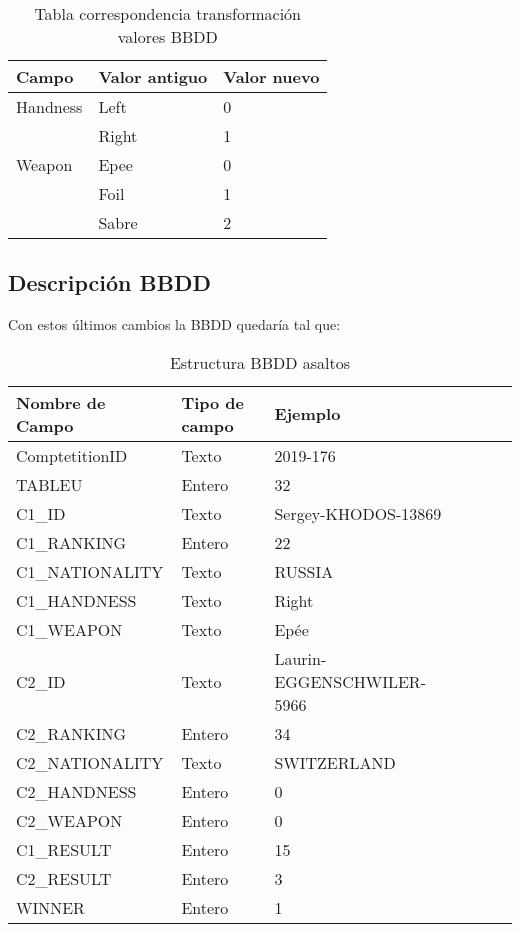 \begin{table}[htb]%
  \centering
  \caption{Tabla correspondencia transformación valores BBDD}
  \label{tab:anchura}
  \begin{tabular}{ | l | ll | }
    \hline
    Campo & \multicolumn{1}{l|}{Valor antiguo} & Valor nuevo \\ \hline
    Handness & Left & 0 \\ \cline{2-3}
     & Right & 1 \\ \hline
    Weapon & Epee & 0 \\ \cline{2-3}
     & Foil & 1 \\ \cline{2-3}
     & Sabre & 2 \\ \hline
  \end{tabular}
\end{table}

\subsection{Descripción BBDD}

Con estos últimos cambios la BBDD quedaría tal que:
\begin{table}[htb]%
  \centering
  \caption{Estructura BBDD asaltos}
  \label{tab:anchura}
  \begin{tabular}{ | l | l | l | l | l | l | }
    \hline
    Nombre de Campo & Tipo de campo & Ejemplo \\ \hline
    ComptetitionID & Texto & 2019-176 \\ \hline
    TABLEU & Entero & 32 \\ \hline
    C1\_ID & Texto & Sergey-KHODOS-13869 \\ \hline
    C1\_RANKING & Entero & 22 \\ \hline
    C1\_NATIONALITY & Texto & RUSSIA \\ \hline
    C1\_HANDNESS & Texto & Right \\ \hline
    C1\_WEAPON & Texto & Epée \\ \hline
    C2\_ID & Texto & Laurin-EGGENSCHWILER-5966 \\ \hline
    C2\_RANKING & Entero & 34 \\ \hline
    C2\_NATIONALITY & Texto & SWITZERLAND \\ \hline
    C2\_HANDNESS & Entero & 0 \\ \hline
    C2\_WEAPON & Entero & 0 \\ \hline
    C1\_RESULT & Entero & 15 \\ \hline
    C2\_RESULT & Entero & 3 \\ \hline
    WINNER & Entero & 1 \\
    \hline
  \end{tabular}
\end{table}


